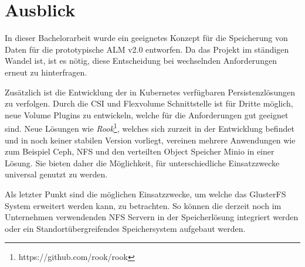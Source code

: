\section{Ausblick} %
\label{sec:ausblick}
In dieser Bachelorarbeit wurde ein geeignetes Konzept für die Speicherung von Daten für die prototypische ALM v2.0 entworfen. Da das Projekt im ständigen Wandel ist, ist es nötig, diese Entscheidung bei wechselnden Anforderungen erneut zu hinterfragen. \medskip

Zusätzlich ist die Entwicklung der in Kubernetes verfügbaren Persistenzlösungen zu verfolgen. Durch die CSI und Flexvolume Schnittstelle ist für Dritte möglich, neue Volume Plugins zu entwickeln, welche für die Anforderungen gut geeignet sind. Neue Lösungen wie \textit{Rook}\footnote{\label{foot:rook}https://github.com/rook/rook}, welches sich zurzeit in der Entwicklung befindet und in noch keiner stabilen Version vorliegt, vereinen mehrere Anwendungen wie zum Beispiel Ceph, NFS und den verteilten Object Speicher Minio in einer Lösung. Sie bieten daher die Möglichkeit, für unterschiedliche Einsatzzwecke universal genutzt zu werden. \medskip

Als letzter Punkt sind die möglichen Einsatzzwecke, um welche das GlusterFS System erweitert werden kann, zu betrachten. So können die derzeit noch im Unternehmen verwendenden NFS Servern in der Speicherlösung integriert werden oder ein Standortübergreifendes Speichersystem aufgebaut werden.

